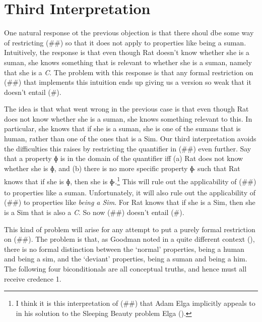 \documentclass[
  11pt,
  letterpaper,
  DIV=11,
  numbers=noendperiod,
  twoside]{scrartcl}
\begin{document}
\section{Third Interpretation}\label{third-interpretation}

One natural response ot the previous objection is that there shoul dbe
some way of restricting (\#\#) so that it does not apply to properties
like being a suman. Intuitively, the response is that even though Rat
doesn't know whether she is a suman, she knows something that is
relevant to whether she is a suman, namely that she is a \emph{C}. The
problem with this response is that any formal restriction on (\#\#) that
implements this intuition ends up giving us a version so weak that it
doesn't entail (\#).

The idea is that what went wrong in the previous case is that even
though Rat does not know whether she is a suman, she knows something
relevant to this. In particular, she knows that if she is a suman, she
is one of the sumans that is human, rather than one of the ones that is
a Sim. Our third interpretation avoids the difficulties this raises by
restricting the quantifier in (\#\#) even further. Say that a property ɸ
is in the domain of the quantifier iff (a) Rat does not know whether she
is ɸ, and (b) there is no more specific property ɸ\textsubscript{′} such
that Rat knows that if she is ɸ, then she is
ɸ\textsubscript{′}.\footnote{I think it is this interpretation of (\#\#)
  that Adam Elga implicitly appeals to in his solution to the Sleeping
  Beauty problem Elga ().} This will
rule out the applicability of (\#\#) to properties like a suman.
Unfortunately, it will also rule out the applicability of (\#\#) to
properties like \emph{being a Sim}. For Rat knows that if she is a Sim,
then she is a Sim that is also a \emph{C}. So now (\#\#) doesn't entail
(\#).

This kind of problem will arise for any attempt to put a purely formal
restriction on (\#\#). The problem is that, as Goodman noted in a quite
different context (), there is
no formal distinction between the `normal' properties, being a human and
being a sim, and the `deviant' properties, being a suman and being a
him. The following four biconditionals are all conceptual truths, and
hence must all receive credence 1.
\end{document}
